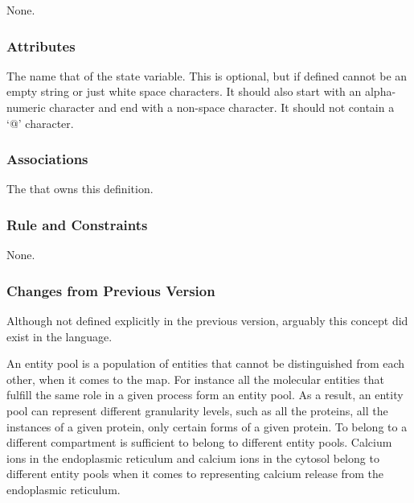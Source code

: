 None.

\subsubsection{Attributes}

\begin{attributes}
   The name that of the state variable. This
  is optional, but if defined cannot be an empty string or just white
  space characters. It should also start with an alpha-numeric
  character and  end with a non-space character. It should not contain
  a `@' character.
\end{attributes}


\subsubsection{Associations}

\begin{attributes}
   The
   that owns this definition.
\end{attributes}

\subsubsection{Rule and Constraints}

None.

\subsubsection{Changes from Previous Version}

Although not defined explicitly in the previous version, arguably this
concept did exist in the language.

\label{sec:techref:EPNs}\label{defn:EntityPoolNode}\label{sec:techref:EPN}

An entity pool is a population of entities that cannot be
distinguished from each other, when it comes to the \SBGNPDLone
map. For instance all the molecular entities that fulfill the same
role in a given process form an entity pool. As a result, an entity
pool can represent different granularity levels, such as all the
proteins, all the instances of a given protein, only certain forms of
a given protein. To belong to a different compartment is sufficient to
belong to different entity pools. Calcium ions in the endoplasmic
reticulum and calcium ions in the cytosol belong to different entity
pools when it comes to representing calcium release from the
endoplasmic reticulum.


